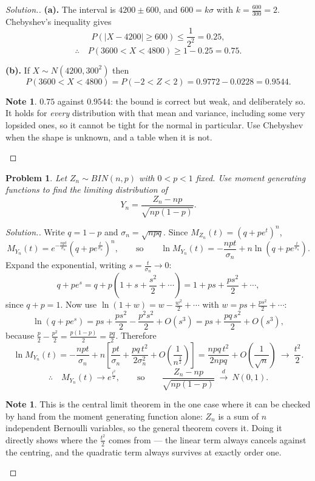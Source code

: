 \documentclass[12pt,a4paper]{report}
\theoremstyle{definition}
\newtheorem{note}[thm]{Note}
\theoremstyle{plain}
\newtheorem{problemx}{Problem}[section]
\newenvironment{problem}{\begin{problemx}}{\end{problemx}}
\newenvironment{solution}
  {\renewcommand{\qedsymbol}{}\begin{proof}[\textit{Solution}.]}
  {\end{proof}}
\begin{document}
\begin{solution}
\textbf{(a).} The interval is $4200\pm600$, and
$600=k\sigma$ with $k=\frac{600}{300}=2$. Chebyshev's inequality gives
\[P\left(\left|X-4200\right|\geq600\right)\leq\frac{1}{2^2}=0.25,\]
\[\therefore\quad P\left(3600<X<4800\right)\geq1-0.25=0.75.\]

\textbf{(b).} If $X\sim N\left(4200,300^2\right)$ then
\[P\left(3600<X<4800\right)=P(-2<Z<2)=0.9772-0.0228=0.9544.\]

\begin{note}
$0.75$ against $0.9544$: the bound is correct but weak, and deliberately so. It
holds for \emph{every} distribution with that mean and variance, including some
very lopsided ones, so it cannot be tight for the normal in particular. Use
Chebyshev when the shape is unknown, and a table when it is not.
\end{note}
\end{solution}

\begin{problem}
Let $Z_n\sim BIN(n,p)$ with $0<p<1$ fixed. Use moment generating functions to
find the limiting distribution of
\[Y_n=\frac{Z_n-np}{\sqrt{np(1-p)}}.\]
\end{problem}

\begin{solution}
Write $q=1-p$ and $\sigma_n=\sqrt{npq}$. Since
$M_{Z_n}(t)=\left(q+pe^t\right)^n$,
\[M_{Y_n}(t)=e^{-\frac{npt}{\sigma_n}}
\left(q+pe^{\frac{t}{\sigma_n}}\right)^n,\qquad\text{so}\qquad
\ln M_{Y_n}(t)=-\frac{npt}{\sigma_n}
+n\ln\left(q+pe^{\frac{t}{\sigma_n}}\right).\]
Expand the exponential, writing $s=\frac{t}{\sigma_n}\to0$:
\[q+pe^{s}=q+p\left(1+s+\frac{s^2}{2}+\cdots\right)
=1+ps+\frac{ps^2}{2}+\cdots,\]
since $q+p=1$. Now use $\ln(1+w)=w-\frac{w^2}{2}+\cdots$ with
$w=ps+\frac{ps^2}{2}+\cdots$:
\[\ln\left(q+pe^{s}\right)=ps+\frac{ps^2}{2}-\frac{p^2s^2}{2}+O\left(s^3\right)
=ps+\frac{pq\,s^2}{2}+O\left(s^3\right),\]
because $\frac{p}{2}-\frac{p^2}{2}=\frac{p(1-p)}{2}=\frac{pq}{2}$. Therefore
\[\ln M_{Y_n}(t)=-\frac{npt}{\sigma_n}+n\left[\frac{pt}{\sigma_n}
+\frac{pq\,t^2}{2\sigma_n^2}+O\!\left(\frac{1}{n^{\frac32}}\right)\right]
=\frac{npq\,t^2}{2npq}+O\!\left(\frac{1}{\sqrt n}\right)
\ \longrightarrow\ \frac{t^2}{2}.\]
\[\therefore\quad M_{Y_n}(t)\longrightarrow e^{\frac{t^2}{2}},
\qquad\text{so}\qquad
\frac{Z_n-np}{\sqrt{np(1-p)}}\ \overset{d}{\longrightarrow}\ N(0,1).\]

\begin{note}
This is the central limit theorem in the one case where it can be checked by hand
from the moment generating function alone: $Z_n$ is a sum of $n$ independent
Bernoulli variables, so the general theorem covers it. Doing it directly shows
where the $\frac{t^2}{2}$ comes from --- the linear term always cancels against
the centring, and the quadratic term always survives at exactly order one.
\end{note}
\end{solution}
\end{document}
